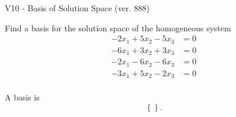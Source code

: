 \begin{exercise}
  \begin{exerciseTitle}V10 - Basis of Solution Space (ver. 888)\end{exerciseTitle}
  \begin{exerciseStatement}
    Find a basis for the solution space of the homogeneous system 
\begin{align*}
 -2 x_ 1 + 5 x_ 2 -5 x_ 3 &= 0  \\ 
  -6 x_ 1 + 3 x_ 2 + 3 x_ 3 &= 0  \\ 
  -2 x_ 1 -6 x_ 2 -6 x_ 3 &= 0  \\ 
  -3 x_ 1 + 5 x_ 2 -2 x_ 3 &= 0  \\ 
 \end{align*}


 
  \end{exerciseStatement}

  \begin{exerciseAnswer}
   A basis is   
\[\left\{\right\}.\]

  


  \end{exerciseAnswer}
\end{exercise}